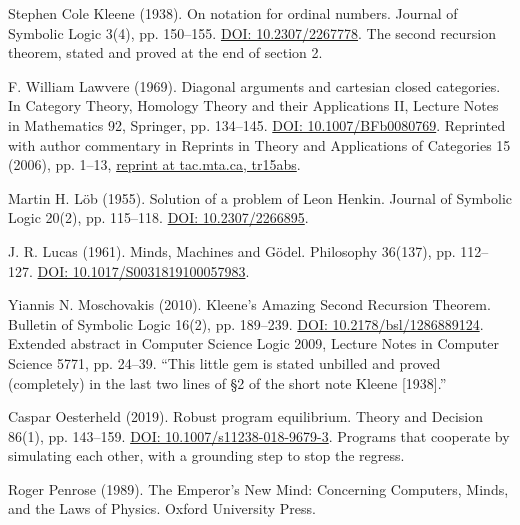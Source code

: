 \documentclass[11pt,twoside]{article}
\theoremstyle{thielethm}
\theoremstyle{thieledef}
\theoremstyle{thieledef}
\theoremstyle{thieledef}
\theoremstyle{thielethm}
\theoremstyle{thieleobs}
\theoremstyle{thielethm}
\begin{document}
\noindent Stephen Cole Kleene (1938). On notation for ordinal numbers. Journal of Symbolic Logic 3(4), pp. 150--155. \href{https://doi.org/10.2307/2267778}{DOI: 10.2307/2267778}. The second recursion theorem, stated and proved at the end of section 2.
\par\medskip

\noindent F. William Lawvere (1969). Diagonal arguments and cartesian closed categories. In Category Theory, Homology Theory and their Applications II, Lecture Notes in Mathematics 92, Springer, pp. 134--145. \href{https://doi.org/10.1007/BFb0080769}{DOI: 10.1007/BFb0080769}. Reprinted with author commentary in Reprints in Theory and Applications of Categories 15 (2006), pp. 1--13, \href{https://www.tac.mta.ca/tac/reprints/articles/15/tr15abs.html}{reprint at tac.mta.ca, tr15abs}.
\par\medskip

\noindent Martin H. L\"ob (1955). Solution of a problem of Leon Henkin. Journal of Symbolic Logic 20(2), pp. 115--118. \href{https://doi.org/10.2307/2266895}{DOI: 10.2307/2266895}.
\par\medskip

\noindent J. R. Lucas (1961). Minds, Machines and G\"odel. Philosophy 36(137), pp. 112--127. \href{https://doi.org/10.1017/S0031819100057983}{DOI: 10.1017/S0031819100057983}.
\par\medskip

\noindent Yiannis N. Moschovakis (2010). Kleene's Amazing Second Recursion Theorem. Bulletin of Symbolic Logic 16(2), pp. 189--239. \href{https://doi.org/10.2178/bsl/1286889124}{DOI: 10.2178/bsl/1286889124}. Extended abstract in Computer Science Logic 2009, Lecture Notes in Computer Science 5771, pp. 24--39. ``This little gem is stated unbilled and proved (completely) in the last two lines of \S2 of the short note Kleene [1938].''
\par\medskip

\noindent Caspar Oesterheld (2019). Robust program equilibrium. Theory and Decision 86(1), pp. 143--159. \href{https://doi.org/10.1007/s11238-018-9679-3}{DOI: 10.1007/s11238-018-9679-3}. Programs that cooperate by simulating each other, with a grounding step to stop the regress.
\par\medskip

\noindent Roger Penrose (1989). The Emperor's New Mind: Concerning Computers, Minds, and the Laws of Physics. Oxford University Press.
\par\medskip
\end{document}
